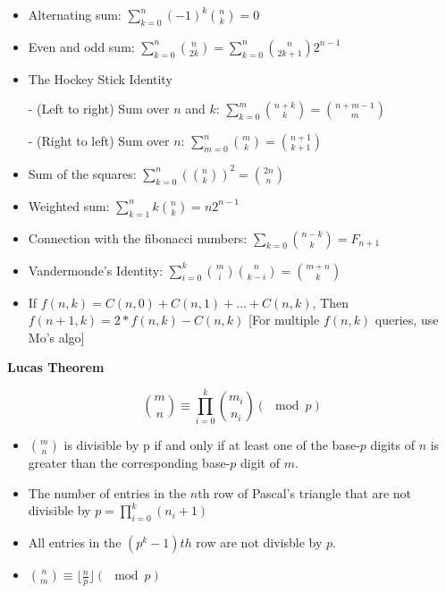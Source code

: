 {\begin{itemize}[leftmargin=*, noitemsep]
  \item Alternating sum: \( \sum_{k = 0}^n (-1)^k \binom{n}{k} = 0 \)

  \item Even and odd sum: \( \sum_{k = 0}^n \binom{n}{2k} = \sum_{k = 0}^n \binom{n}{2k + 1} 2^{n - 1} \)

  \item The Hockey Stick Identity

     - (Left to right) Sum over \( n \) and \( k \): \( \sum_{k = 0}^m \binom{n + k}{k} = \binom{n + m - 1}{m} \)

     - (Right to left) Sum over \( n \): \( \sum_{m = 0}^n \binom{m}{k} = \binom{n + 1}{k + 1} \)

  \item Sum of the squares: \( \sum_{k = 0}^n (\binom{n}{k})^2 = \binom{2n}{n} \)

  \item Weighted sum: \( \sum_{k = 1}^n k \binom{n}{k} = n2^{n - 1} \)

  \item Connection with the fibonacci numbers: \( \sum_{k = 0}\binom{n - k}{k} = F_{n + 1} \)

  \item Vandermonde's Identity: \( \sum_{i = 0}^k \binom{m}{i} \binom{n}{k - i} = \binom{m + n}{k} \)
  \item If \( f(n, k) = C(n, 0) + C(n, 1) + ... + C(n, k) \), Then \( f(n + 1, k) = 2 * f(n, k) - C(n, k) \) [For multiple \( f(n, k) \) queries, use Mo's algo]
\end{itemize}

\textbf{Lucas Theorem}

\[ \binom{m}{n} \equiv \prod_{i = 0}^k \binom{m_i}{n_i} (\mod p) \]

\begin{itemize}[leftmargin=*, noitemsep]
  \item \( \binom{m}{n} \) is divisible by p if and only if at least one of the base-\(p\) digits of \( n \) is greater than the corresponding base-\( p \) digit of \( m \).

  \item The number of entries in the \( n \)th row of Pascal's triangle that are not divisible by \( p  = \prod_{i = 0}^k (n_i + 1) \)

  \item All entries in the \( (p^{k} - 1)th \) row are not divisble by \( p \).
  \item \( \binom{n}{m} \equiv \lfloor \frac{n}{p} \rfloor (\mod p) \)
\end{itemize}

}
